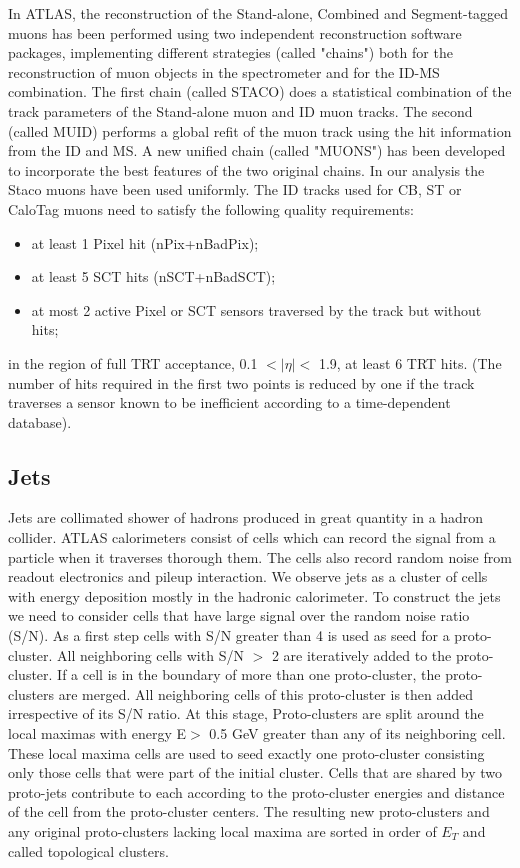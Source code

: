 In ATLAS, the reconstruction of the Stand-alone, Combined and Segment-tagged muons has been performed using two independent reconstruction software packages, implementing different strategies (called "chains") both for the reconstruction of muon objects in the spectrometer and for the ID-MS combination. The first chain (called STACO) does a statistical combination of the track parameters of the Stand-alone muon and ID muon tracks. The second (called MUID) performs a global refit of the muon track using the hit information from the ID and MS. A new unified chain (called "MUONS") has been developed to incorporate the best features of the two original chains. In our analysis the Staco muons have been used uniformly.
The ID tracks used for CB, ST or CaloTag muons need to satisfy the following quality requirements:
\begin{itemize} 
\item at least 1 Pixel hit (nPix+nBadPix);
\item at least 5 SCT hits (nSCT+nBadSCT);
\item at most 2 active Pixel or SCT sensors traversed by the track but without hits;
\end{itemize} in the region of full TRT acceptance, 0.1 $< |\eta| <$ 1.9, at least 6 TRT hits.
(The number of hits required in the first two points is reduced by one if the track traverses a sensor known to be inefficient according to a time-dependent database). 



\subsection{Jets}
Jets are collimated shower of hadrons produced in great quantity in a hadron collider. 
ATLAS calorimeters consist of cells which can record the signal from a particle when it traverses thorough them. The cells also record random noise from readout electronics and pileup interaction. We observe jets as a cluster of cells with energy deposition mostly in the hadronic calorimeter.
To construct the jets we need to consider cells that have large signal over the random noise ratio (S/N).  As a first step cells with S/N greater than 4 is used as seed for a proto-cluster. All neighboring cells with S/N $>$ 2 are iteratively added to the proto-cluster.  If a cell is in the boundary of more than one proto-cluster, the proto-clusters are merged. All neighboring cells of this proto-cluster is then added irrespective of its S/N ratio.
At this stage, Proto-clusters are split around the local maximas with energy  E$>$ 0.5 GeV greater than any of its neighboring cell. These local maxima cells are used to seed exactly one proto-cluster consisting only those cells that were part of the initial cluster. Cells that are shared by two proto-jets contribute to each according to the proto-cluster energies and distance of the cell from the proto-cluster centers.
The resulting new proto-clusters and any original proto-clusters lacking local maxima are sorted in order of $E_{T}$ and called topological clusters. 

